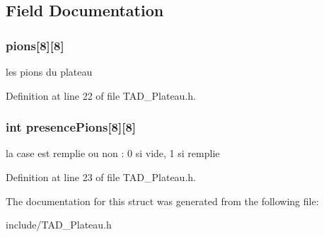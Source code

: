 \subsection{Field Documentation}
\hypertarget{struct_plateau_aa14649bf1b37b316f42ffcb79c1951a5}{}
\subsubsection[{pions}]{ pions\mbox{[}8\mbox{]}\mbox{[}8\mbox{]}}\label{struct_plateau_aa14649bf1b37b316f42ffcb79c1951a5}
les pions du plateau 

Definition at line 22 of file T\+A\+D\+\_\+\+Plateau.\+h.

\hypertarget{struct_plateau_a5df6e631fe34def5ff04a0b4dd233ae5}{}
\subsubsection[{presence\+Pions}]{\setlength{\rightskip}{0pt plus 5cm}int presence\+Pions\mbox{[}8\mbox{]}\mbox{[}8\mbox{]}}\label{struct_plateau_a5df6e631fe34def5ff04a0b4dd233ae5}
la case est remplie ou non \+: 0 si vide, 1 si remplie 

Definition at line 23 of file T\+A\+D\+\_\+\+Plateau.\+h.



The documentation for this struct was generated from the following file\+:\begin{DoxyCompactItemize}
\item 
include/T\+A\+D\+\_\+\+Plateau.\+h\end{DoxyCompactItemize}
